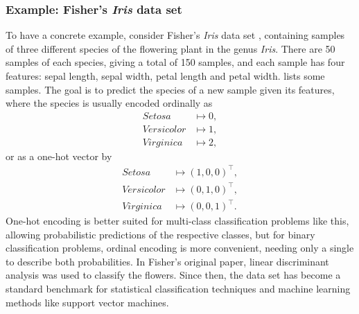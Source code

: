 \subsubsection{Example: Fisher's \textit{Iris} data set}
\label{sec:iris}
To have a concrete example, consider Fisher's \textit{Iris} data set \cite{fisher1936}, containing samples of three different species of the flowering plant in the genus \textit{Iris}.
There are 50 samples of each species, giving a total of 150 samples, and each sample has four features: sepal length, sepal width, petal length and petal width.
 lists some samples.
The goal is to predict the species of a new sample given its features, where the species is usually encoded ordinally as
\begin{equation}
    \label{eq:iris_encoding}
    \begin{split}
        \textit{Setosa} &\mapsto 0,\\
        \textit{Versicolor} &\mapsto 1,\\
        \textit{Virginica} &\mapsto 2,
    \end{split}
\end{equation}
or as a one-hot vector by
\begin{equation}
    \label{eq:iris_one_hot}
    \begin{split}
        \textit{Setosa} &\mapsto (1, 0, 0)^\top,\\
        \textit{Versicolor} &\mapsto (0, 1, 0)^\top,\\
        \textit{Virginica} &\mapsto (0, 0, 1)^\top.
    \end{split}
\end{equation}
One-hot encoding is better suited for multi-class classification problems like this, allowing probabilistic predictions of the respective classes, but for binary classification problems, ordinal encoding is more convenient, needing only a single to describe both probabilities.
In Fisher's original paper, linear discriminant analysis was used to classify the flowers.
Since then, the data set has become a standard benchmark for statistical classification techniques and machine learning methods like support vector machines.


